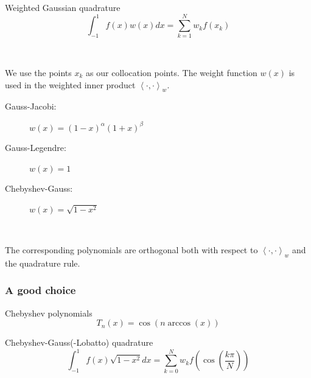 \documentclass{beamer}
\newcommand{\inner}[2]{\left \langle #1, #2 \right \rangle}
\begin{document}
\begin{frame}

\begin{block}{Weighted Gaussian quadrature}
\begin{equation*}
\int_{-1}^1 f(x) w(x) dx = \sum_{k=1}^N w_k f(x_k)
\end{equation*}
\end{block}

~

We use the points $x_k$ as our collocation points.
The weight function $w(x)$ is used in the weighted inner product
$
\inner{\cdot}{\cdot}_w .
$

\end{frame}

\begin{frame}

\begin{description}
\item[Gauss-Jacobi:] $w(x) = (1-x)^\alpha (1+x)^\beta$
\item[Gauss-Legendre:] $w(x) = 1$
\item[Chebyshev-Gauss:] $w(x) = \sqrt{1-x^2}$
\end{description}

~

The corresponding polynomials are orthogonal both with respect to $\inner{\cdot}{\cdot}_w$ and the quadrature rule.

\end{frame}

\begin{frame}

\frametitle{A good choice}

\begin{block}{Chebyshev polynomials}
\begin{equation*}
T_n(x) = \cos \left ( n \arccos \left ( x \right ) \right )
\end{equation*}
\end{block}

\begin{block}{Chebyshev-Gauss(-Lobatto) quadrature}
\begin{equation*}
\int_{-1}^1 f(x) \sqrt{1-x^2} dx = \sum_{k=0}^N w_k f \left ( \cos \left ( \frac{ k \pi}{N} \right ) \right )
\end{equation*}
\end{block}

\end{frame}
\end{document}
